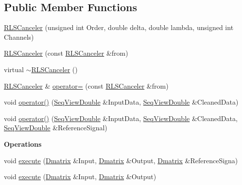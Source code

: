 \subsection*{Public Member Functions}
\begin{DoxyCompactItemize}
\item 
\hyperlink{classtsa_1_1_r_l_s_canceler_aab2d9be86611bc4b0f2912e7f673e478}{R\+L\+S\+Canceler} (unsigned int Order, double delta, double lambda, unsigned int Channels)
\item 
\hyperlink{classtsa_1_1_r_l_s_canceler_a80a39cdda14b8d902e720932b5fcf052}{R\+L\+S\+Canceler} (const \hyperlink{classtsa_1_1_r_l_s_canceler}{R\+L\+S\+Canceler} \&from)
\item 
virtual \hyperlink{classtsa_1_1_r_l_s_canceler_a3aadd00151305795177bf2b2e394f140}{$\sim$\+R\+L\+S\+Canceler} ()
\item 
\hyperlink{classtsa_1_1_r_l_s_canceler}{R\+L\+S\+Canceler} \& \hyperlink{classtsa_1_1_r_l_s_canceler_ad37c41807b26bb323a1fc044b17a5ca9}{operator=} (const \hyperlink{classtsa_1_1_r_l_s_canceler}{R\+L\+S\+Canceler} \&from)
\item 
void \hyperlink{classtsa_1_1_r_l_s_canceler_aa83e2ee91b1e68b54099455dc6e5f3c6}{operator()} (\hyperlink{namespacetsa_ac599574bcc094eda25613724b8f3ca9e}{Seq\+View\+Double} \&Input\+Data, \hyperlink{namespacetsa_ac599574bcc094eda25613724b8f3ca9e}{Seq\+View\+Double} \&Cleaned\+Data)
\item 
void \hyperlink{classtsa_1_1_r_l_s_canceler_a8801aca2920a4cdaca83c41fdc5d7754}{operator()} (\hyperlink{namespacetsa_ac599574bcc094eda25613724b8f3ca9e}{Seq\+View\+Double} \&Input\+Data, \hyperlink{namespacetsa_ac599574bcc094eda25613724b8f3ca9e}{Seq\+View\+Double} \&Cleaned\+Data, \hyperlink{namespacetsa_ac599574bcc094eda25613724b8f3ca9e}{Seq\+View\+Double} \&Reference\+Signal)
\end{DoxyCompactItemize}
\begin{Indent}\textbf{ Operations}\par
\begin{DoxyCompactItemize}
\item 
void \hyperlink{classtsa_1_1_r_l_s_canceler_ab6cb776cf208561a60840498626965dd}{execute} (\hyperlink{namespacetsa_ad260cd21c1891c4ed391fe788569aba4}{Dmatrix} \&Input, \hyperlink{namespacetsa_ad260cd21c1891c4ed391fe788569aba4}{Dmatrix} \&Output, \hyperlink{namespacetsa_ad260cd21c1891c4ed391fe788569aba4}{Dmatrix} \&Reference\+Signa)
\item 
void \hyperlink{classtsa_1_1_r_l_s_canceler_a823ebcfe58dffca733a2d36400623cd5}{execute} (\hyperlink{namespacetsa_ad260cd21c1891c4ed391fe788569aba4}{Dmatrix} \&Input, \hyperlink{namespacetsa_ad260cd21c1891c4ed391fe788569aba4}{Dmatrix} \&Output)
\end{DoxyCompactItemize}
\end{Indent}
